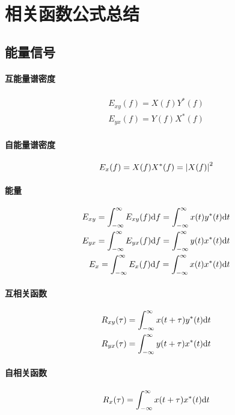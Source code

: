 \section{相关函数公式总结}\label{appendix:IV}
\subsection{能量信号}
    \paragraph{互能量谱密度}
    \begin{equation}
        \begin{split}
            E_{xy}(f)=X(f)Y^*(f)\\
            E_{yx}(f)=Y(f)X^*(f)
        \end{split}
    \end{equation}
    \paragraph{自能量谱密度}
    \begin{equation}
        E_x(f)=X(f)X^*(f)=\left\vert X(f) \right\vert^2
    \end{equation}
    \paragraph{能量}
    \begin{align}
        E_{xy}=\int_{-\infty}^{\infty}E_{xy}(f)\text{\upshape d} f=\int_{-\infty}^{\infty}x(t)y^*(t)\text{\upshape d} t\\
        E_{yx}=\int_{-\infty}^{\infty}E_{yx}(f)\text{\upshape d} f=\int_{-\infty}^{\infty}y(t)x^*(t)\text{\upshape d} t\\
        E_x=\int_{-\infty}^{\infty}E_x(f)\text{\upshape d} f=\int_{-\infty}^{\infty}x(t)x^*(t)\text{\upshape d} t
    \end{align}
    \paragraph{互相关函数}
    \begin{equation}
        \begin{split}
            R_{xy}(\tau)=\int_{-\infty}^{\infty}x(t+\tau)y^*(t)\text{\upshape d} t\\
            R_{yx}(\tau)=\int_{-\infty}^{\infty}y(t+\tau)x^*(t)\text{\upshape d} t
        \end{split}
    \end{equation}
    \paragraph{自相关函数}
    \begin{equation}
        R_x(\tau)=\int_{-\infty}^{\infty}x(t+\tau)x^*(t)\text{\upshape d} t
    \end{equation}

